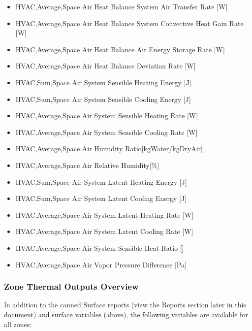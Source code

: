 \begin{itemize}
  HVAC,Average,Space Air Heat Balance Outdoor Air Transfer Rate {[}W{]}
\item
  HVAC,Average,Space Air Heat Balance System Air Transfer Rate {[}W{]}
\item
  HVAC,Average,Space Air Heat Balance System Convective Heat Gain Rate {[}W{]}
\item
  HVAC,Average,Space Air Heat Balance Air Energy Storage Rate {[}W{]}
\item
  HVAC,Average,Space Air Heat Balance Deviation Rate {[}W{]}
\item
  HVAC,Sum,Space Air System Sensible Heating Energy {[}J{]}
\item
  HVAC,Sum,Space Air System Sensible Cooling Energy {[}J{]}
\item
  HVAC,Average,Space Air System Sensible Heating Rate {[}W{]}
\item
  HVAC,Average,Space Air System Sensible Cooling Rate {[}W{]}
\item
  HVAC,Average,Space Air Humidity Ratio{[}kgWater/kgDryAir{]}
\item
  HVAC,Average,Space Air Relative Humidity{[}\%{]}
\item
  HVAC,Sum,Space Air System Latent Heating Energy {[}J{]}
\item
  HVAC,Sum,Space Air System Latent Cooling Energy {[}J{]}
\item
  HVAC,Average,Space Air System Latent Heating Rate {[}W{]}
\item
  HVAC,Average,Space Air System Latent Cooling Rate {[}W{]}
\item
  HVAC,Average,Space Air System Sensible Heat Ratio {[}{]}
\item
  HVAC,Average,Space Air Vapor Pressure Difference {[}Pa{]}
\end{itemize}

\subsubsection{Zone Thermal Outputs Overview}\label{zone-thermal-outputs}

In addition to the canned Surface reports (view the Reports section later in this document) and surface variables (above), the following variables are available for all zones:

